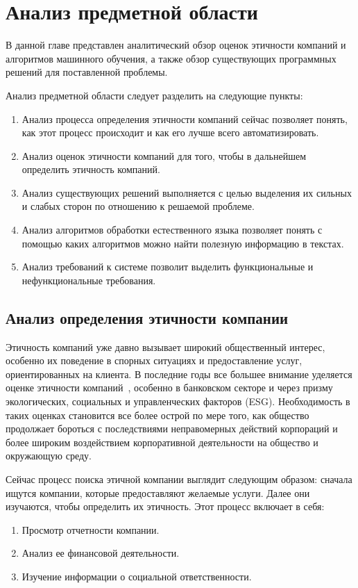 \documentclass[PI, VKR]{HSEUniversity}
\begin{document}
\chapter{Анализ предметной области}
\label{sec:org1180f65}
В данной главе представлен аналитический обзор оценок этичности компаний и алгоритмов машинного обучения, а также обзор существующих программных решений для поставленной проблемы.

Анализ предметной области следует разделить на следующие пункты:
\begin{enumerate}
\item Анализ процесса определения этичности компаний сейчас позволяет понять, как этот процесс происходит и как его лучше всего автоматизировать.
\item Анализ оценок этичности компаний для того, чтобы в дальнейшем определить этичность компаний.
\item Анализ существующих решений выполняется с целью выделения их сильных и слабых сторон по отношению к решаемой проблеме.
\item Анализ алгоритмов обработки естественного языка позволяет понять с помощью каких алгоритмов можно найти полезную информацию в текстах.
\item Анализ требований к системе позволит выделить функциональные и нефункциональные требования.
\end{enumerate}
\section{Анализ определения этичности компании}
\label{sec:orga4057de}
Этичность компаний уже давно вызывает широкий общественный интерес, особенно их поведение в спорных ситуациях и предоставление услуг, ориентированных на клиента. В последние годы все большее внимание уделяется оценке этичности компаний~\autocites{mure_esg_2021}[][]{semenko_korporativnaya_2022}[][]{kudryavceva_korporativnosocialnaya_2016}, особенно в банковском секторе и через призму экологических, социальных и управленческих факторов (ESG). Необходимость в таких оценках становится все более острой по мере того, как общество продолжает бороться с последствиями неправомерных действий корпораций и более широким воздействием корпоративной деятельности на общество и окружающую среду.

Сейчас процесс поиска этичной компании выглядит следующим образом: сначала ищутся компании, которые предоставляют желаемые услуги. Далее они изучаются, чтобы определить их этичность. Этот процесс включает в себя:
\begin{enumerate}
\item Просмотр отчетности компании.
\item Анализ ее финансовой деятельности.
\item Изучение информации о социальной ответственности.
\end{enumerate}
\end{document}
